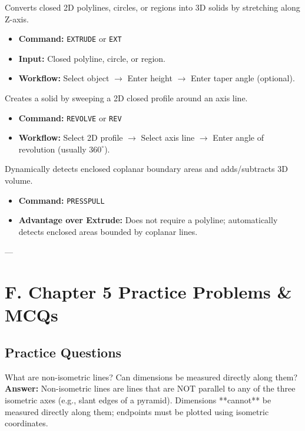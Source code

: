 \begin{autocadcmd}[EXTRUDE]
Converts closed 2D polylines, circles, or regions into 3D solids by stretching along Z-axis.
\begin{itemize}
    \item \textbf{Command:} \texttt{EXTRUDE} or \texttt{EXT}
    \item \textbf{Input:} Closed polyline, circle, or region.
    \item \textbf{Workflow:} Select object $\to$ Enter height $\to$ Enter taper angle (optional).
\end{itemize}
\end{autocadcmd}

\begin{autocadcmd}[REVOLVE]
Creates a solid by sweeping a 2D closed profile around an axis line.
\begin{itemize}
    \item \textbf{Command:} \texttt{REVOLVE} or \texttt{REV}
    \item \textbf{Workflow:} Select 2D profile $\to$ Select axis line $\to$ Enter angle of revolution (usually $360^\circ$).
\end{itemize}
\end{autocadcmd}

\begin{autocadcmd}[PRESSPULL]
Dynamically detects enclosed coplanar boundary areas and adds/subtracts 3D volume.
\begin{itemize}
    \item \textbf{Command:} \texttt{PRESSPULL}
    \item \textbf{Advantage over Extrude:} Does not require a polyline; automatically detects enclosed areas bounded by coplanar lines.
\end{itemize}
\end{autocadcmd}

---

\section{F. Chapter 5 Practice Problems \& MCQs}

\subsection{Practice Questions}

\begin{vivaqa}
What are non-isometric lines? Can dimensions be measured directly along them?\\[4pt]
\textbf{Answer:} Non-isometric lines are lines that are NOT parallel to any of the three isometric axes (e.g., slant edges of a pyramid). Dimensions **cannot** be measured directly along them; endpoints must be plotted using isometric coordinates.
\end{vivaqa}

